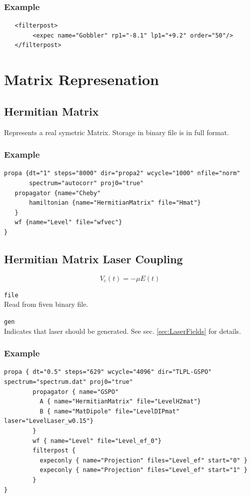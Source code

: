 \documentclass[a4paper,12pt]{scrbook}
\newcommand{\option}[2]{\item \texttt{#1}\\ #2}
\begin{document}
\subsubsection*{Example}
\begin{verbatim}
   <filterpost>
        <expec name="Gobbler" rp1="-8.1" lp1="+9.2" order="50"/>
   </filterpost>
\end{verbatim}


\section{Matrix Represenation}
\subsection{Hermitian Matrix}
Represents a real symetric Matrix.
Storage in binary file is in full format.

\subsubsection*{Example}
\begin{verbatim}
propa {dt="1" steps="8000" dir="propa2" wcycle="1000" nfile="norm"
       spectrum="autocorr" proj0="true"
   propagator {name="Cheby"
       hamiltonian {name="HermitianMatrix" file="Hmat"}
   }
   wf {name="Level" file="wfvec"}
}
\end{verbatim}


\subsection{Hermitian Matrix Laser Coupling}
\begin{equation}
 V_c(t) = -\mu E(t)
\end{equation}

\begin{options}
 \option{file}{Read from fiven binary file.}
 \option{gen}{Indicates that laser should be generated. See sec. \ref{sec:LaserFields} for details.}
\end{options}

\subsubsection*{Example}
\begin{verbatim}
propa { dt="0.5" steps="629" wcycle="4096" dir="TLPL-GSPO" spectrum="spectrum.dat" proj0="true"
        propagator { name="GSPO"
          A { name="HermitianMatrix" file="LevelH2mat"}
          B { name="MatDipole" file="LevelDIPmat" laser="LevelLaser_w0.15"}
        }
        wf { name="Level" file="Level_ef_0"}
        filterpost {
          expeconly { name="Projection" files="Level_ef" start="0" }
          expeconly { name="Projection" files="Level_ef" start="1" }
        }
}
\end{verbatim}
\end{document}
